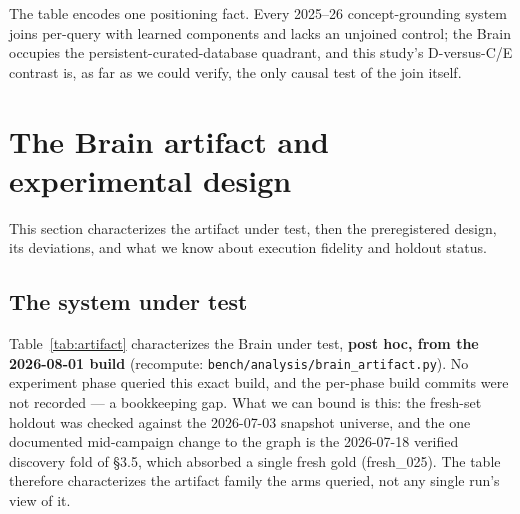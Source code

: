 \documentclass[10pt]{article}
\newcommand{\code}[1]{\texttt{#1}}
\begin{document}
The table encodes one positioning fact. Every 2025--26 concept-grounding
system joins per-query with learned components and lacks an unjoined
control; the Brain occupies the persistent-curated-database quadrant,
and this study's D-versus-C/E contrast is, as far as we could verify,
the only causal test of the join itself.

\section{The Brain artifact and experimental design}\label{sec:design}

This section characterizes the artifact under test, then the
preregistered design, its deviations, and what we know about execution
fidelity and holdout status.

\subsection{The system under test}\label{sec:artifact}

Table~\ref{tab:artifact} characterizes the Brain under test, \textbf{post
hoc, from the 2026-08-01 build} (recompute:
\code{bench/analysis/brain\_artifact.py}). No experiment phase queried
this exact build, and the per-phase build commits were not recorded --- a
bookkeeping gap. What we can bound is this: the fresh-set holdout was
checked against the 2026-07-03 snapshot universe, and the one documented
mid-campaign change to the graph is the 2026-07-18 verified discovery
fold of \S 3.5, which absorbed a single fresh gold (fresh\_025). The
table therefore characterizes the artifact family the arms queried, not
any single run's view of it.
\end{document}
